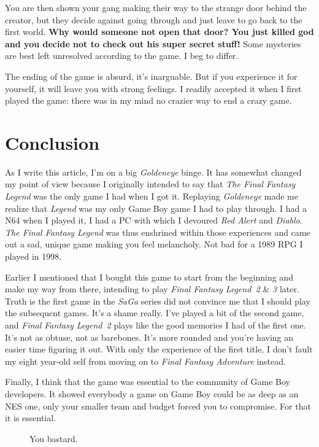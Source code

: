 \documentclass{book}
\begin{document}
You are then shown your gang making their way to the strange door behind the creator, but they decide against going through and just leave to go back to the first world. \textbf{Why would someone not open that door? You just killed god and you decide not to check out his super secret stuff!} Some mysteries are best left unresolved according to the game. I beg to differ.\par
The ending of the game is absurd, it’s inarguable. But if you experience it for yourself, it will leave you with strong feelings. I readily accepted it when I first played the game: there was in my mind no crazier way to end a crazy game.\par
\FloatBarrier\section*{Conclusion}
As I write this article, I’m on a big \emph{Goldeneye} binge. It has somewhat changed my point of view because I originally intended to say that \emph{The Final Fantasy Legend} was the only game I had when I got it. Replaying \emph{Goldeneye} made me realize that \emph{Legend} was my only Game Boy game I had to play through. I had a N64 when I played it, I had a PC with which I devoured \emph{Red Alert} and \emph{Diablo}. \emph{The Final Fantasy Legend} was thus enshrined within those experiences and came out a sad, unique game making you feel melancholy. Not bad for a 1989 RPG I played in 1998.\par
Earlier I mentioned that I bought this game to start from the beginning and make my way from there, intending to play \emph{Final Fantasy Legend~2} \& \emph{3} later. Truth is the first game in the \emph{SaGa} series did not convince me that I should play the subsequent games. It’s a shame really. I’ve played a bit of the second game, and \emph{Final Fantasy Legend~2} plays like the good memories I had of the first one. It’s not as obtuse, not as barebones. It’s more rounded and you’re having an easier time figuring it out. With only the experience of the first title, I don’t fault my eight year-old self from moving on to \emph{Final Fantasy Adventure} instead.\par
Finally, I think that the game was essential to the community of Game Boy developers. It showed everybody a game on Game Boy could be as deep as an NES one, only your smaller team and budget forced you to compromise. For that it is essential.\par
\FloatBarrier\vspace{\baselineskip}\begin{figure}[H]\caption*{You bastard.}\end{figure}
\endgroup 
\end{document}
